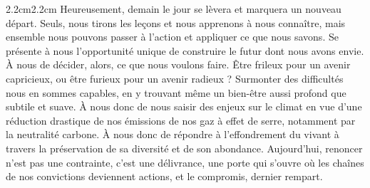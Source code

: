 \begin{adjustwidth}{2.2cm}{2.2cm}
Heureusement, demain le jour se lèvera et marquera un nouveau départ. Seuls, nous tirons les leçons et nous apprenons à nous connaître, mais ensemble nous pouvons passer à l’action et appliquer ce que nous savons. Se présente à nous l’opportunité unique de construire le futur dont nous avons envie. À nous de décider, alors, ce que nous voulons faire. Être frileux pour un avenir capricieux, ou être furieux pour un avenir radieux ? Surmonter des difficultés nous en sommes capables, en y trouvant même un bien-être aussi profond que subtile et suave. À nous donc de nous saisir des enjeux sur le climat en vue d’une réduction drastique de nos émissions de nos gaz à effet de serre, notamment par la neutralité carbone. À nous donc de répondre à l’effondrement du vivant à travers la préservation de sa diversité et de son abondance. Aujourd’hui, renoncer n’est pas une contrainte, c’est une délivrance, une porte qui s’ouvre où les chaînes de nos convictions deviennent actions, et le compromis, dernier rempart.


\end{adjustwidth}
